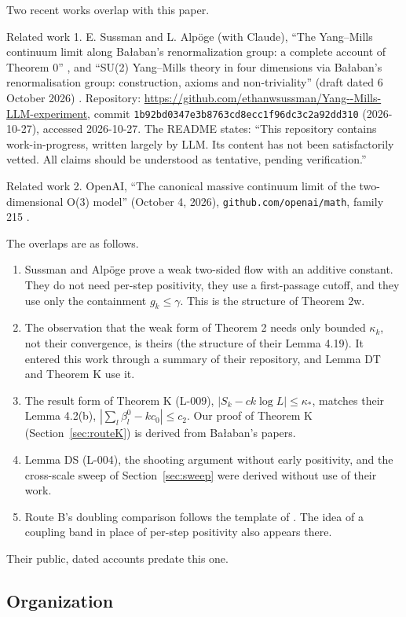 Two recent works overlap with this paper.

Related work 1. E. Sussman and L. Alp\"oge (with Claude), ``The Yang--Mills continuum limit along Ba{\l}aban's renormalization group: a complete account of Theorem 0'' \cite{SA26-T0}, and ``SU(2) Yang--Mills theory in four dimensions via Ba{\l}aban's renormalisation group: construction, axioms and non-triviality'' (draft dated 6 October 2026) \cite{SA26-YM4}. Repository: \url{https://github.com/ethanwsussman/Yang--Mills-LLM-experiment}, commit \texttt{1b92bd0347e3b8763cd8ecc1f96dc3c2a92dd310} (2026-10-27), accessed 2026-10-27. The README states: ``This repository contains work-in-progress, written largely by LLM. Its content has not been satisfactorily vetted. All claims should be understood as tentative, pending verification.''

Related work 2. OpenAI, ``The canonical massive continuum limit of the two-dimensional O(3) model'' (October 4, 2026), \texttt{github.com/openai/math}, family 215 \cite{OAI26-O3}.

The overlaps are as follows.
\begin{enumerate}
\item Sussman and Alp\"oge prove a weak two-sided flow with an additive constant. They do not need per-step positivity, they use a first-passage cutoff, and they use only the containment $g_k\le\gamma$. This is the structure of Theorem 2w.
\item The observation that the weak form of Theorem 2 needs only bounded $\kappa_k$, not their convergence, is theirs (the structure of their Lemma 4.19). It entered this work through a summary of their repository, and Lemma DT and Theorem K use it.
\item The result form of Theorem K (L-009), $|S_k-ck\log L|\le\kappa_*$, matches their Lemma 4.2(b), $|\sum_l\beta^0_l-kc_0|\le c_2$. Our proof of Theorem K (Section~\ref{sec:routeK}) is derived from Ba{\l}aban's papers.
\item Lemma DS (L-004), the shooting argument without early positivity, and the cross-scale sweep of Section~\ref{sec:sweep} were derived without use of their work.
\item Route B's doubling comparison follows the template of \cite[Lemma 6.1]{OAI26-O3}. The idea of a coupling band in place of per-step positivity also appears there.
\end{enumerate}
Their public, dated accounts predate this one.

\subsection{Organization}


